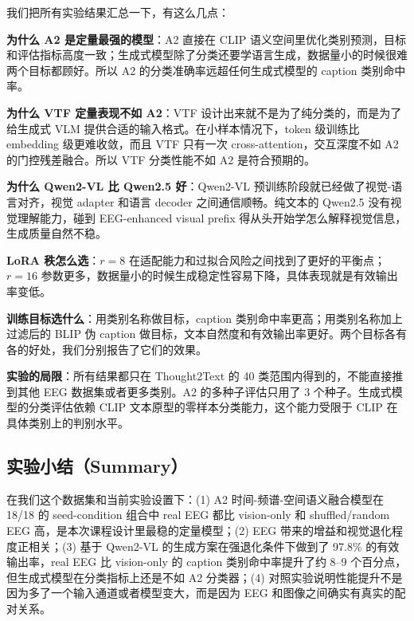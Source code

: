 我们把所有实验结果汇总一下，有这么几点：

\textbf{为什么 A2 是定量最强的模型}：A2 直接在 CLIP 语义空间里优化类别预测，目标和评估指标高度一致；生成式模型除了分类还要学语言生成，数据量小的时候很难两个目标都顾好。所以 A2 的分类准确率远超任何生成式模型的 caption 类别命中率。

\textbf{为什么 VTF 定量表现不如 A2}：VTF 设计出来就不是为了纯分类的，而是为了给生成式 VLM 提供合适的输入格式。在小样本情况下，token 级训练比 embedding 级更难收敛，而且 VTF 只有一次 cross-attention，交互深度不如 A2 的门控残差融合。所以 VTF 分类性能不如 A2 是符合预期的。

\textbf{为什么 Qwen2-VL 比 Qwen2.5 好}：Qwen2-VL 预训练阶段就已经做了视觉-语言对齐，视觉 adapter 和语言 decoder 之间通信顺畅。纯文本的 Qwen2.5 没有视觉理解能力，碰到 EEG-enhanced visual prefix 得从头开始学怎么解释视觉信息，生成质量自然不稳。

\textbf{LoRA 秩怎么选}：$r=8$ 在适配能力和过拟合风险之间找到了更好的平衡点；$r=16$ 参数更多，数据量小的时候生成稳定性容易下降，具体表现就是有效输出率变低。

\textbf{训练目标选什么}：用类别名称做目标，caption 类别命中率更高；用类别名称加上过滤后的 BLIP 伪 caption 做目标，文本自然度和有效输出率更好。两个目标各有各的好处，我们分别报告了它们的效果。

\textbf{实验的局限}：所有结果都只在 Thought2Text 的 40 类范围内得到的，不能直接推到其他 EEG 数据集或者更多类别。A2 的多种子评估只用了 3 个种子。生成式模型的分类评估依赖 CLIP 文本原型的零样本分类能力，这个能力受限于 CLIP 在具体类别上的判别水平。

\subsection{实验小结（Summary）}

在我们这个数据集和当前实验设置下：(1) A2 时间-频谱-空间语义融合模型在 18/18 的 seed-condition 组合中 real EEG 都比 vision-only 和 shuffled/random EEG 高，是本次课程设计里最稳的定量模型；(2) EEG 带来的增益和视觉退化程度正相关；(3) 基于 Qwen2-VL 的生成方案在强退化条件下做到了 97.8\% 的有效输出率，real EEG 比 vision-only 的 caption 类别命中率提升了约 8--9 个百分点，但生成式模型在分类指标上还是不如 A2 分类器；(4) 对照实验说明性能提升不是因为多了一个输入通道或者模型变大，而是因为 EEG 和图像之间确实有真实的配对关系。
